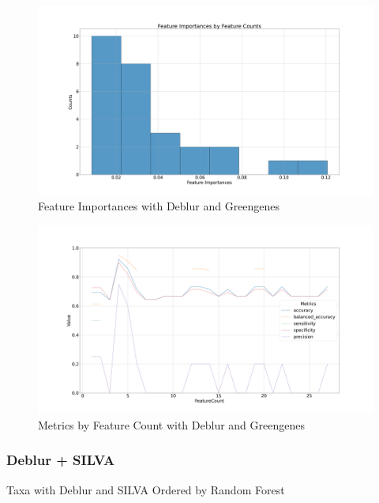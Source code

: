 \documentclass[a4paper]{article}
\begin{document}
                \begin{figure}[p]
                    \centering
                    \includegraphics[width=0.7 \linewidth]{figures/RandomForest/ANCOM.Deblur.gg/importances.png}
                    \caption{Feature Importances with Deblur and Greengenes}
                    \label{fig:importances-Deblur-gg}
                \end{figure}

                \begin{figure}[p]
                    \centering
                    \includegraphics[width=0.7 \linewidth]{figures/RandomForest/ANCOM.Deblur.gg/metrics.png}
                    \caption{Metrics by Feature Count with Deblur and Greengenes}
                    \label{fig:metrics-Deblur-gg}
                \end{figure}

            \subsubsection{Deblur + SILVA}

                \begin{table}[p]
                    \centering
                    \caption{Taxa with Deblur and SILVA Ordered by Random Forest}
                    \label{tb:RF-whole-Deblur-silva}

                \end{table}
\end{document}
